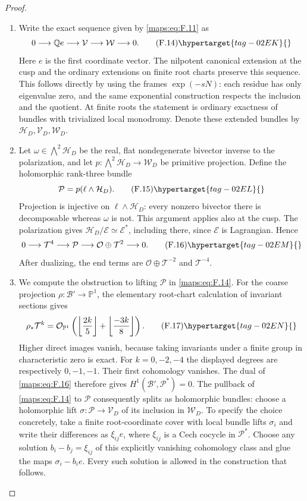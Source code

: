 \begin{proof}
\begin{enumerate}[label={$\langle1\rangle$\arabic*.}]
\item Write the exact sequence given by \eqref{maps:eq:F.11} as
\[
 0\longrightarrow\mathbb Q e\longrightarrow\mathcal V
   \longrightarrow\mathcal W\longrightarrow0.
 \tag{F.14}\hypertarget{tag-02EK}{}\label{maps:eq:F.14}
\]
Here $e$ is the first coordinate vector.  The nilpotent canonical
extension at the cusp and the ordinary extensions on finite root
charts preserve this sequence.  This follows directly by using
the frames $\exp(-sN)$: each residue has only eigenvalue zero,
and the same exponential construction respects the inclusion and
the quotient.  At finite roots the statement is ordinary exactness
of bundles with trivialized local monodromy.  Denote these extended
bundles by $\mathcal H_D,\mathcal V_D,\mathcal W_D$.

\item Let $\omega\in\bigwedge^2\mathcal H_D$ be the real, flat
nondegenerate bivector inverse to the polarization, and let
$p:\bigwedge^2\mathcal H_D\to\mathcal W_D$ be primitive projection.
Define the holomorphic rank-three bundle
\[
 \mathcal P=p(\ell\wedge\mathcal H_D).
 \tag{F.15}\hypertarget{tag-02EL}{}\label{maps:eq:F.15}
\]
Projection is injective on $\ell\wedge\mathcal H_D$: every
nonzero bivector there is decomposable whereas $\omega$ is not.
This argument applies also at the cusp.  The polarization gives
$\mathcal H_D/\mathcal E\simeq\mathcal E^*$, including there,
since $\mathcal E$ is Lagrangian.  Hence
\[
 0\longrightarrow\mathcal T^4\longrightarrow\mathcal P
 \longrightarrow\mathcal O\oplus\mathcal T^2\longrightarrow0.
 \tag{F.16}\hypertarget{tag-02EM}{}\label{maps:eq:F.16}
\]
After dualizing, the end terms are
$\mathcal O\oplus\mathcal T^{-2}$ and $\mathcal T^{-4}$.

\item We compute the obstruction to lifting $\mathcal P$ in \eqref{maps:eq:F.14}.
For the coarse projection $\rho:\mathcal B'\to\mathbb P^1$,
the elementary root-chart calculation of invariant sections gives
\[
 \rho_*\mathcal T^k=
 \mathcal O_{\mathbb P^1}
 \left(\left\lfloor\frac{2k}{5}\right\rfloor+
       \left\lfloor\frac{-3k}{8}\right\rfloor\right).
 \tag{F.17}\hypertarget{tag-02EN}{}\label{maps:eq:F.17}
\]
Higher direct images vanish, because taking invariants under a
finite group in characteristic zero is exact.  For $k=0,-2,-4$
the displayed degrees are respectively $0,-1,-1$.  Their first
cohomology vanishes.  The dual of \eqref{maps:eq:F.16} therefore gives
$H^1(\mathcal B',\mathcal P^*)=0$.
The pullback of \eqref{maps:eq:F.14} to $\mathcal P$ consequently splits as
holomorphic bundles: choose a holomorphic lift
$\sigma:\mathcal P\to\mathcal V_D$ of its inclusion in
$\mathcal W_D$.  
To specify the choice concretely, take a finite root-coordinate
cover with local bundle lifts $\sigma_i$ and write their
differences as $\xi_{ij}e$, where
$\xi_{ij}$ is a Cech cocycle in $\mathcal P^*$.
Choose any solution $b_i-b_j=\xi_{ij}$ of this explicitly
vanishing cohomology class and glue the maps
$\sigma_i-b_ie$.  Every such solution is allowed in the
construction that follows.


\end{enumerate}
\end{proof}

